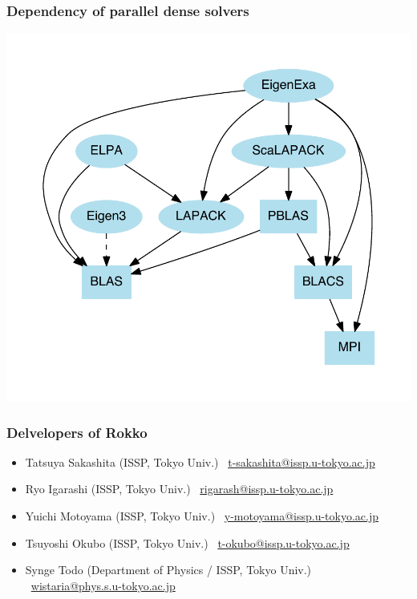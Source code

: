 \begin{frame}
  \frametitle{Dependency of parallel dense solvers}
  \begin{center}
    \includegraphics[height=0.8\textheight]{figure/eigensolver_dependency.pdf}
  \end{center}
\end{frame}

\begin{frame}
  \frametitle{Delvelopers of Rokko}
  \begin{itemize}
    \setlength{\itemsep}{1em}
  \item Tatsuya Sakashita (ISSP, Tokyo Univ.) \ \href{mailto:t-sakashita@issp.u-tokyo.ac.jp}{t-sakashita@issp.u-tokyo.ac.jp}
  \item Ryo Igarashi (ISSP, Tokyo Univ.) \ \href{mailto:rigarash@issp.u-tokyo.ac.jp}{rigarash@issp.u-tokyo.ac.jp}
\item Yuichi Motoyama (ISSP, Tokyo Univ.) \ \href{mailto:y-motoyama@issp.u-tokyo.ac.jp}{y-motoyama@issp.u-tokyo.ac.jp}
  \item Tsuyoshi Okubo (ISSP, Tokyo Univ.) \ \href{mailto:t-okubo@issp.u-tokyo.ac.jp}{t-okubo@issp.u-tokyo.ac.jp}
  \item Synge Todo (Department of Physics / ISSP, Tokyo Univ.) \ \href{mailto:wistaria@phys.s.u-tokyo.ac.jp}{wistaria@phys.s.u-tokyo.ac.jp}
  \end{itemize}
\end{frame}

